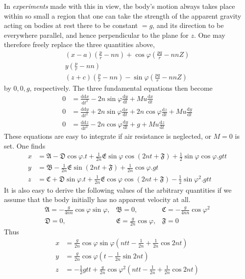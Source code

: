 In \textit{experiments} made with this in view, the body's motion always takes place within so small a region that one can take the strength of the apparent gravity acting on bodies at rest there to be constant $=g$, and its direction to be everywhere parallel, and hence perpendicular to the plane for $z$. One may therefore freely replace the three quantities above,
\[
\begin{gathered}
(x-a)(\tfrac pr-nn)+\cos\varphi(\tfrac{pq}{r}-nnZ)\\
y(\tfrac pr-nn)\\
(z+c)(\tfrac pr-nn)-\sin\varphi(\tfrac{pq}{r}-nnZ)
\end{gathered}
\]
by $0,0,g$, respectively. The three fundamental equations then become
\[
\begin{aligned}
0&=\frac{\mathrm{dd}x}{\mathrm{d}t^2}-2n\sin\varphi\frac{\mathrm{d}y}{\mathrm{d}t}+Mu\frac{\mathrm{d}x}{\mathrm{d}t}\\
0&=\frac{\mathrm{dd}y}{\mathrm{d}t^2}+2n\sin\varphi\frac{\mathrm{d}x}{\mathrm{d}t}+2n\cos\varphi\frac{\mathrm{d}z}{\mathrm{d}t}+Mu\frac{\mathrm{d}y}{\mathrm{d}t}\\
0&=\frac{\mathrm{dd}z}{\mathrm{d}t^2}-2n\cos\varphi\frac{\mathrm{d}y}{\mathrm{d}t}+g+Mu\frac{\mathrm{d}z}{\mathrm{d}t}
\end{aligned}
\]
These equations are easy to integrate if air resistance is neglected, or $M=0$ is set. One finds
\[
\begin{aligned}
x&=\mathfrak{A}-\mathfrak{D}\cos\varphi.t+\tfrac{1}{2n}\mathfrak{E}\sin\varphi\cos(2nt+\mathfrak{F})+\tfrac12\sin\varphi\cos\varphi.gtt\\
y&=\mathfrak{B}-\tfrac{1}{2n}\mathfrak{E}\sin(2nt+\mathfrak{F})+\tfrac{1}{2n}\cos\varphi.gt\\
z&=\mathfrak{C}+\mathfrak{D}\sin\varphi.t+\tfrac{1}{2n}\mathfrak{E}\cos\varphi\cos(2nt+\mathfrak{F})-\tfrac12\sin\varphi^2.gtt
\end{aligned}
\]
It is also easy to derive the following values of the arbitrary quantities if we assume that the body initially has no apparent velocity at all.
\[
\begin{array}{lll}
\mathfrak{A}=-\tfrac{g}{4nn}\cos\varphi\sin\varphi,&\mathfrak{B}=0,&\mathfrak{C}=-\tfrac{g}{4nn}\cos\varphi^2\\
\mathfrak{D}=0,&\mathfrak{E}=\tfrac{g}{2n}\cos\varphi,&\mathfrak{F}=0
\end{array}
\]
Thus
\[
\begin{aligned}
x&=\tfrac{g}{2n}\cos\varphi\sin\varphi(ntt-\tfrac{1}{2n}+\tfrac{1}{2n}\cos2nt)\\
y&=\tfrac{g}{2n}\cos\varphi(t-\tfrac{1}{2n}\sin2nt)\\
z&=-\tfrac12gtt+\tfrac{g}{2n}\cos\varphi^2(ntt-\tfrac{1}{2n}+\tfrac{1}{2n}\cos2nt)
\end{aligned}
\]
